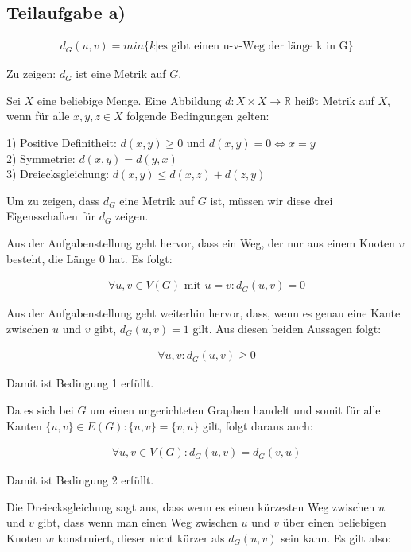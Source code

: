 \documentclass[12pt]{scrartcl}%
\theoremstyle{nonumberplain}
\newcommand{\R}{\mathbb{R}}
\begin{document}
\subsection*{Teilaufgabe a)}

\begin{align*}
	d_G(u,v) = min\{k | \text{es gibt einen u-v-Weg der länge k in G}\}
\end{align*}

Zu zeigen: $d_G$ ist eine Metrik auf $G$.

Sei $X$ eine beliebige Menge. Eine Abbildung $d: X \times X \rightarrow \R$ heißt Metrik auf $X$, wenn für alle $x,y,z \in X$ folgende Bedingungen gelten:

1) Positive Definitheit: $d(x,y) \ge 0$ und $d(x,y) = 0 \Leftrightarrow x = y $ \\
2) Symmetrie: $d(x,y) = d(y,x)$ \\
3) Dreiecksgleichung: $d(x,y) \le d(x,z) + d(z,y)$

Um zu zeigen, dass $d_G$ eine Metrik auf $G$ ist, müssen wir diese drei Eigensschaften für $d_G$ zeigen.

Aus der Aufgabenstellung geht hervor, dass ein Weg, der nur aus einem Knoten $v$ besteht, die Länge $0$ hat. Es folgt:

\begin{align*}
	\forall u,v \in V(G)\text{ mit } u=v: d_G(u,v) = 0
\end{align*}

Aus der Aufgabenstellung geht weiterhin hervor, dass, wenn es genau eine Kante zwischen $u$ und $v$ gibt, $d_G(u,v) = 1$ gilt.  Aus diesen beiden Aussagen folgt:

\begin{align*}
	\forall u,v: d_G(u,v) \ge 0
\end{align*}

Damit ist Bedingung 1 erfüllt.

Da es sich bei $G$ um einen ungerichteten Graphen handelt und somit für alle Kanten $\{u,v\} \in E(G): \{u,v\} = \{v,u\}$ gilt, folgt daraus auch:

\begin{align*}
	\forall u,v \in V(G): d_G(u,v) = d_G(v,u)
\end{align*}

Damit ist Bedingung 2 erfüllt.

Die Dreiecksgleichung sagt aus, dass wenn es einen kürzesten Weg zwischen $u$ und $v$ gibt, dass wenn man einen Weg zwischen $u$ und $v$ über einen beliebigen Knoten $w$ konstruiert, dieser nicht kürzer als $d_G(u,v)$ sein kann. Es gilt also:
\end{document}
